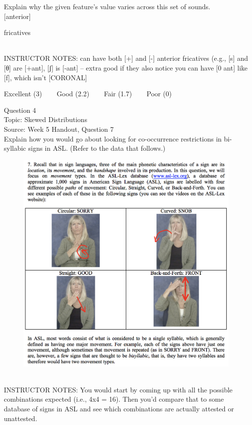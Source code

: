 \documentclass[12pt]{article}
\begin{document}
Explain why the given feature's value varies across this set of sounds.\\

{[anterior]}

fricatives


~\\
INSTRUCTOR NOTES: can have both [+] and [-] anterior fricatives (e.g., [s] and [θ] are [+ant], [ʃ] is [-ant] -- extra good if they also notice you can have [0 ant] like [f], which isn't [CORONAL]


\vfill
Excellent (3) ~~~ Good (2.2) ~~~ Fair (1.7) ~~~ Poor (0)
\newpage

{\large Question 4}\\

Topic: Skewed Distributions\\
Source: Week 5 Handout, Question 7\\

Explain how you would go about looking for co-occurrence restrictions in bi-syllabic signs in ASL. (Refer to the data that follows.)\\

\begin{figure}[H]
\includegraphics{../images/ASL_movement.png}
\end{figure}

~\\
INSTRUCTOR NOTES: You would start by coming up with all the possible combinations expected (i.e., 4x4 = 16). Then you'd compare that to some database of signs in ASL and see which combinations are actually attested or unattested.
\end{document}
